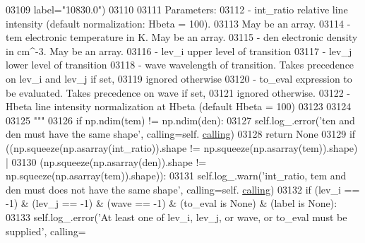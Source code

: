 \begin{DoxyCode}
03109 \textcolor{stringliteral}{                label="10830.0")}
03110 \textcolor{stringliteral}{            }
03111 \textcolor{stringliteral}{        Parameters:}
03112 \textcolor{stringliteral}{            - int\_ratio    relative line intensity (default normalization: Hbeta = 100). }
03113 \textcolor{stringliteral}{                            May be an array.}
03114 \textcolor{stringliteral}{            - tem          electronic temperature in K. May be an array.}
03115 \textcolor{stringliteral}{            - den          electronic density in cm^-3. May be an array.}
03116 \textcolor{stringliteral}{            - lev\_i        upper level of transition}
03117 \textcolor{stringliteral}{            - lev\_j        lower level of transition}
03118 \textcolor{stringliteral}{            - wave         wavelength of transition. Takes precedence on lev\_i and lev\_j if set, }
03119 \textcolor{stringliteral}{                            ignored otherwise }
03120 \textcolor{stringliteral}{            - to\_eval      expression to be evaluated. Takes precedence on wave if set, }
03121 \textcolor{stringliteral}{                            ignored otherwise.}
03122 \textcolor{stringliteral}{            - Hbeta        line intensity normalization at Hbeta (default Hbeta = 100)}
03123 \textcolor{stringliteral}{}
03124 \textcolor{stringliteral}{        }
03125 \textcolor{stringliteral}{        """}
03126         \textcolor{keywordflow}{if} np.ndim(tem) != np.ndim(den):
03127             self.log\_.error(\textcolor{stringliteral}{'ten and den must have the same shape'}, calling=self.
      \hyperlink{classpyneb_1_1core_1_1pynebcore_1_1_rec_atom_a82ec425ebba32b73a5d9ae52717d47c4}{calling})
03128             \textcolor{keywordflow}{return} \textcolor{keywordtype}{None}
03129         \textcolor{keywordflow}{if} ((np.squeeze(np.asarray(int\_ratio)).shape != np.squeeze(np.asarray(tem)).shape) | 
03130             (np.squeeze(np.asarray(den)).shape != np.squeeze(np.asarray(tem)).shape)):
03131             self.log\_.warn(\textcolor{stringliteral}{'int\_ratio, tem and den must does not have the same shape'}, calling=self.
      \hyperlink{classpyneb_1_1core_1_1pynebcore_1_1_rec_atom_a82ec425ebba32b73a5d9ae52717d47c4}{calling})
03132         \textcolor{keywordflow}{if} (lev\_i == -1) & (lev\_j == -1) & (wave == -1) & (to\_eval \textcolor{keywordflow}{is} \textcolor{keywordtype}{None}) & (label \textcolor{keywordflow}{is} \textcolor{keywordtype}{None}):
03133             self.log\_.error(\textcolor{stringliteral}{'At least one of lev\_i, lev\_j, or wave, or to\_eval must be supplied'}, calling=

\end{DoxyCode}
